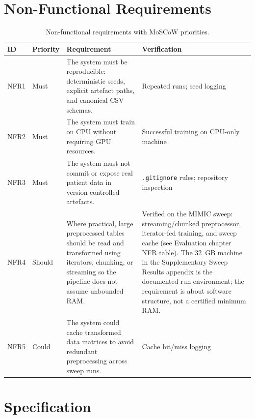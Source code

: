 \section{Non-Functional Requirements}

\begin{table}[H]
\centering
\small
\begin{singlespace}
\setlength{\tabcolsep}{3pt}
\begin{tabularx}{\textwidth}{@{}ll>{\raggedright\arraybackslash}Xl@{}}
\toprule
\textbf{ID} & \textbf{Priority} & \textbf{Requirement} & \textbf{Verification} \\
\midrule
NFR1 & Must & The system must be reproducible: deterministic seeds, explicit artefact paths, and canonical CSV schemas. & Repeated runs; seed logging \\
\midrule
NFR2 & Must & The system must train on CPU without requiring GPU resources. & Successful training on CPU-only machine \\
\midrule
NFR3 & Must & The system must not commit or expose real patient data in version-controlled artefacts. & \texttt{.gitignore} rules; repository inspection \\
\midrule
NFR4 & Should & Where practical, large preprocessed tables should be read and transformed using iterators, chunking, or streaming so the pipeline does not assume unbounded RAM. & Verified on the MIMIC sweep: streaming/chunked preprocessor, iterator-fed training, and sweep cache (see Evaluation chapter NFR table). The 32~GB machine in the Supplementary Sweep Results appendix is the documented run environment; the requirement is about software structure, not a certified minimum RAM. \\
\midrule
NFR5 & Could & The system could cache transformed data matrices to avoid redundant preprocessing across sweep runs. & Cache hit/miss logging \\
\bottomrule
\end{tabularx}
\end{singlespace}
\caption{Non-functional requirements with MoSCoW priorities.}
\label{tab:nonfunc-req}
\end{table}

\section{Specification}

